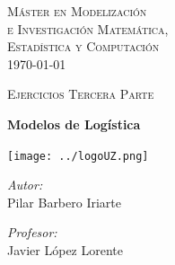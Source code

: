 \documentclass[a4paper,12pt]{article}
\author{Pilar Barbero Iriarte}
\begin{document}
\begin{titlepage}
\begin{center}



\textsc{\LARGE M\'aster en Modelizaci\'on \\e Investigaci\'on Matem\'atica,\\ Estad\'istica y Computaci\'on }\\[1.5cm]
{\large \today}

\textsc{Ejercicios Tercera Parte}\\[0.5cm]

\vfill

{ \huge \bfseries Modelos de Log\'istica \\[0.4cm] }

\vfill


\texttt{[image: ../logoUZ.png]}~\\[1cm]

\noindent
\begin{minipage}{0.4\textwidth}
\begin{flushleft} \large
\emph{Autor:}\\
Pilar Barbero Iriarte 
\end{flushleft}
\end{minipage}%
\begin{minipage}{0.4\textwidth}
\begin{flushright} \large
\emph{Profesor:} \\
Javier L\'opez Lorente
\end{flushright}
\end{minipage}

\end{center}


\end{titlepage}

\pagebreak
\tableofcontents
\pagebreak
\end{document}
